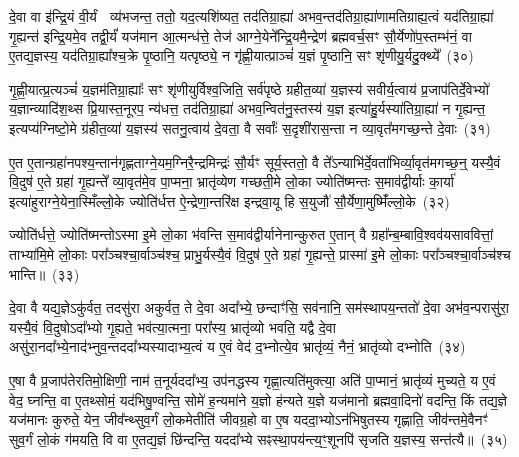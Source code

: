 {\anuvakamend[{अव॑ दाधार मि॒त्रेणै॒व प्री॑णाति॒ षट्च॑}]}

दे॒वा वा इ॑न्द्रि॒यं वी॒र्यं  व्य॑भजन्त॒ ततो॒ यद॒त्यशि॑ष्यत॒ तद॑तिग्रा॒ह्या॑ अभव॒न्तद॑तिग्रा॒ह्या॑णामतिग्राह्य॒त्वं यद॑तिग्रा॒ह्या॑ गृ॒ह्यन्त॑ इन्द्रि॒यमे॒व तद्वी॒र्यं॑ यज॑मान आ॒त्मन्ध॑त्ते॒ तेज॑ आग्ने॒येने᳚न्द्रि॒यमै॒न्द्रेण॑ ब्रह्मवर्च॒सꣳ सौ॒र्येणो॑प॒स्तम्भ॑नं॒ वा ए॒तद्य॒ज्ञस्य॒ यद॑तिग्रा॒ह्या᳚श्च॒क्रे पृ॒ष्ठानि॒ यत्पृष्ठ्ये॒ न गृ॑ह्णी॒यात्प्राञ्चं॑ य॒ज्ञं पृ॒ष्ठानि॒ सꣳ शृ॑णीयु॒र्यदु॒क्थ्ये᳚~(३०)\ip

गृ॒ह्णी॒यात्प्र॒त्यञ्चं॑ य॒ज्ञम॑तिग्रा॒ह्याः᳚ सꣳ शृ॑णीयुर्विश्व॒जिति॒ सर्व॑पृष्ठे ग्रहीत॒व्या॑ य॒ज्ञस्य॑ सवीर्य॒त्वाय॑ प्र॒जा\-प॑तिर्दे॒वेभ्यो॑ य॒ज्ञान्व्यादि॑श॒थ्स प्रि॒यास्त॒नूरप॒ न्य॑धत्त॒ तद॑तिग्रा॒ह्या॑ अभव॒न्वित॑नु॒स्तस्य॑ य॒ज्ञ इत्या॑हु॒र्यस्या॑तिग्रा॒ह्या॑ न गृ॒ह्यन्त॒ इत्यप्य॑ग्निष्टो॒मे ग्र॑हीत॒व्या॑ य॒ज्ञस्य॑ सतनु॒त्वाय॑ दे॒वता॒ वै सर्वाः᳚ स॒दृशी॑रास॒न्ता न व्या॒वृत᳚मगच्छ॒न्ते दे॒वाः~(३१)\ip

ए॒त ए॒तान्ग्रहा॑नपश्य॒न्तान॑गृह्णताग्ने॒यम॒ग्निरै॒न्द्रमिन्द्रः॑ सौ॒र्यꣳ सूर्य॒स्ततो॒ वै ते᳚\-ऽन्याभि॑र्दे॒वता॑भिर्व्या॒वृत॑मगच्छ॒न्॒ यस्यै॒वं वि॒दुष॑ ए॒ते ग्रहा॑ गृ॒ह्यन्ते᳚ व्या॒वृत॑मे॒व पा॒प्मना॒ भ्रातृ॑व्येण गच्छती॒मे लो॒का ज्योति॑ष्मन्तः स॒माव॑द्वीर्याः का॒र्या॑ इत्या॑हुराग्ने॒येना॒स्मिँल्लो॒के ज्योति॑र्धत्त ऐ॒न्द्रेणा॒न्तरि॑क्ष इन्द्रवा॒यू हि स॒युजौ॑ सौ॒र्येणा॒मुष्मिँ॑ल्लो॒के~(३२)\ip

ज्योति॑र्धत्ते॒ ज्योति॑ष्मन्तो\-ऽस्मा इ॒मे लो॒का भ॑वन्ति स॒माव॑द्वीर्यानेनान्कुरुत ए॒तान् वै ग्रहा᳚न्ब॒म्बावि॒श्वव॑यसाववित्तां॒ ताभ्या॑मि॒मे लो॒काः परा᳚ञ्चश्चा॒र्वाञ्च॑श्च॒ प्राभु॒र्यस्यै॒वं वि॒दुष॑ ए॒ते ग्रहा॑ गृ॒ह्यन्ते॒ प्रास्मा॑ इ॒मे लो॒काः परा᳚ञ्चश्चा॒र्वाञ्च॑श्च भान्ति॥~(३३)\ip

{\anuvakamend[{उ॒क्थ्ये॑ दे॒वा अ॒मुष्मिँ॑ल्लो॒क एका॒न्नच॑त्वारि॒ꣳ॒शच्च॑}]}

दे॒वा वै यद्य॒ज्ञे\-ऽकु॑र्वत॒ तदसु॑रा अकुर्वत॒ ते दे॒वा अदा᳚भ्ये॒ छन्दाꣳ॑सि॒ सव॑नानि॒ सम॑स्थापय॒न्ततो॑ दे॒वा अभ॑व॒न्परासु॑रा॒ यस्यै॒वं वि॒दुषो\-ऽदा᳚भ्यो गृ॒ह्यते॒ भव॑त्या॒त्मना॒ परा᳚स्य॒ भ्रातृ॑व्यो भवति॒ यद्वै दे॒वा असु॑रा॒नदा᳚भ्ये॒ना\-द॑भ्नुव॒न्तददा᳚भ्यस्यादाभ्य॒त्वं य ए॒वं वेद॑ द॒भ्नोत्ये॒व भ्रातृ॑व्यं॒ नैनं॒ भ्रातृ॑व्यो दभ्नोति~(३४)\ip

ए॒षा वै प्र॒जा\-प॑तेरतिमो॒क्षिणी॒ नाम॑ त॒नूर्यददा᳚भ्य॒ उप॑नद्धस्य गृह्णा॒त्यति॑मुक्त्या॒ अति॑ पा॒प्मानं॒ भ्रातृ॑व्यं मुच्यते॒ य ए॒वं वेद॒ घ्नन्ति॒ वा ए॒तथ्सोमं॒ यद॑भिषु॒ण्वन्ति॒ सोमे॑ ह॒न्यमा॑ने य॒ज्ञो ह॑न्यते य॒ज्ञे यज॑मानो ब्रह्मवा॒दिनो॑ वदन्ति॒ किं तद्य॒ज्ञे यज॑मानः कुरुते॒ येन॒ जीव᳚न्थ्सुव॒र्गं लो॒कमेतीति॑ जीवग्र॒हो वा ए॒ष यददा॒भ्यो\-ऽन॑भिषुतस्य गृह्णाति॒ जीव॑न्तमे॒वैनꣳ॑ सुव॒र्गं लो॒कं ग॑मयति॒ वि वा ए॒तद्य॒ज्ञं छि॑न्दन्ति॒ यददा᳚भ्ये सꣴस्था॒पय॑न्त्य॒ꣳ॒शूनपि॑ सृजति य॒ज्ञस्य॒ सन्त॑त्यै॥~(३५)\ip

